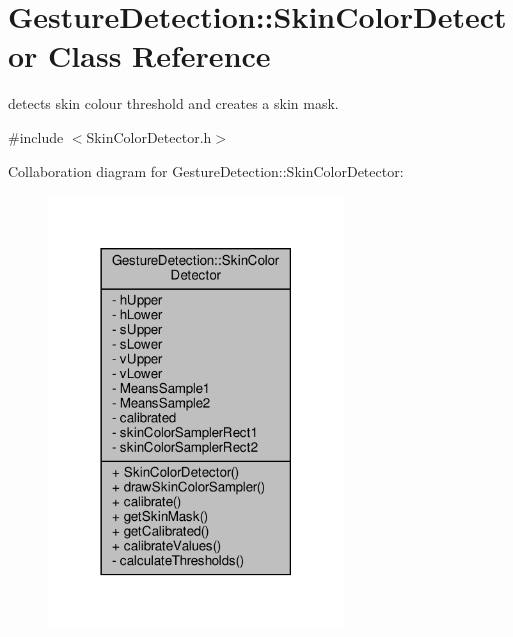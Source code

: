 \hypertarget{class_gesture_detection_1_1_skin_color_detector}{}\section{Gesture\+Detection\+:\+:Skin\+Color\+Detector Class Reference}
\label{class_gesture_detection_1_1_skin_color_detector}


detects skin colour threshold and creates a skin mask.  




{\ttfamily \#include $<$Skin\+Color\+Detector.\+h$>$}



Collaboration diagram for Gesture\+Detection\+:\+:Skin\+Color\+Detector\+:
\nopagebreak
\begin{figure}[H]
\begin{center}
\leavevmode
\includegraphics[width=222pt]{class_gesture_detection_1_1_skin_color_detector__coll__graph}
\end{center}
\end{figure}
